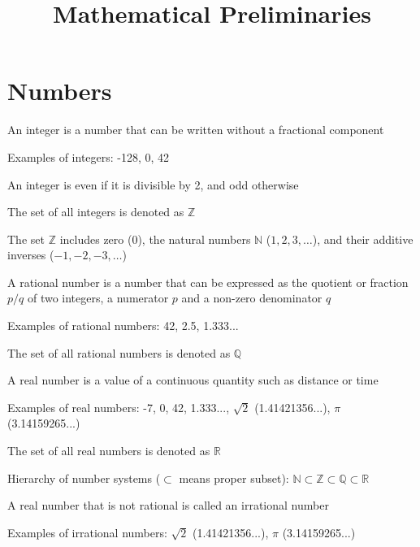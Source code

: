 \documentclass[8pt,a4paper,compress]{beamer}
\title{Mathematical Preliminaries}
\date{}
\begin{document}
\begin{frame}
\vfill
\titlepage
\end{frame}

\section{Numbers}
\begin{frame}[fragile]
\pause\transdissolve

An integer is a number that can be written without a fractional component

\pause\transdissolve\bigskip

Examples of integers: -128, 0, 42

\pause\transdissolve\bigskip

An integer is even if it is divisible by 2, and odd otherwise

\pause\transdissolve\bigskip

The set of all integers is denoted as $\mathbb{Z}$

\pause\transdissolve\bigskip

The set $\mathbb{Z}$ includes zero (0), the natural numbers $\mathbb{N}$ ($1, 2, 3, \dots$), and their additive inverses ($-1, -2, -3, \dots$)
\end{frame}

\begin{frame}[fragile]
\pause\transdissolve

A rational number is a number that can be expressed as the quotient or fraction $p/q$ of two integers, a numerator $p$ and a non-zero denominator $q$

\pause\transdissolve\bigskip

Examples of rational numbers: 42, 2.5, 1.333...

\pause\transdissolve\bigskip

The set of all rational numbers is denoted as $\mathbb{Q}$
\end{frame}

\begin{frame}[fragile]
\pause\transdissolve

A real number is a value of a continuous quantity such as distance or time

\pause\transdissolve\bigskip

Examples of real numbers: -7, 0, 42, 1.333..., $\sqrt{2}$ (1.41421356...), $\pi$ (3.14159265...)

\pause\transdissolve\bigskip

The set of all real numbers is denoted as $\mathbb{R}$

\pause\transdissolve\bigskip

Hierarchy of number systems ($\subset$ means proper subset): $\mathbb{N} \subset \mathbb{Z} \subset \mathbb{Q} \subset \mathbb{R}$

\pause\transdissolve\bigskip

A real number that is not rational is called an irrational number

\pause\transdissolve\bigskip

Examples of irrational numbers: $\sqrt{2}$ (1.41421356...), $\pi$ (3.14159265...)
\end{frame}
\end{document}
